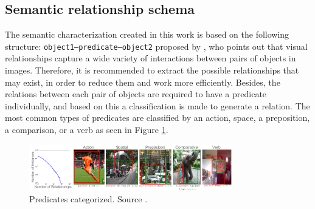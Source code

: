 \subsection{Semantic relationship schema}
The semantic characterization created in this work is based on the following 
structure: \texttt{object1--predicate--object2} proposed by \cite{Cewu}, who 
points out that visual relationships capture a wide variety of interactions 
between pairs of objects in images. Therefore, it is recommended to extract the 
possible relationships that may exist, in order to reduce them and work more 
efficiently. Besides, the relations between each pair of objects are required 
to have a predicate individually, and based on this a classification is made 
to generate a relation. The most common types of predicates are classified 
by an action, space, a preposition, a comparison, or a verb as seen in Figure 
\ref{fig:predaCar}.

\begin{figure}[H]
    \centering
    \includegraphics[width=8.8cm]{figures/predica.png}
    \caption{Predicates categorized. Source \cite{Cewu}.}
    \label{fig:predaCar}
\end{figure}

